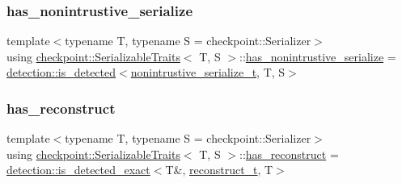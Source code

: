 \subsubsection{\texorpdfstring{has\+\_\+nonintrustive\+\_\+serialize}{has\_nonintrustive\_serialize}}
{\footnotesize\ttfamily template$<$typename T, typename S = checkpoint\+::\+Serializer$>$ \\
using \hyperlink{structcheckpoint_1_1_serializable_traits}{checkpoint\+::\+Serializable\+Traits}$<$ T, S $>$\+::\hyperlink{structcheckpoint_1_1_serializable_traits_abc3628bc485acd98b08840fb99450850}{has\+\_\+nonintrustive\+\_\+serialize} =  \hyperlink{namespacedetection_a30893549a3de1e9603d78dad6d5dce92}{detection\+::is\+\_\+detected}$<$\hyperlink{structcheckpoint_1_1_serializable_traits_a3284d2cfd29cfe429d5cf76186d3fe3c}{nonintrustive\+\_\+serialize\+\_\+t}, T, S$>$}

\mbox{\label{structcheckpoint_1_1_serializable_traits_a1c37f2f1a317fdd0d198c3d6ad2d35c4}} 
\subsubsection{\texorpdfstring{has\+\_\+reconstruct}{has\_reconstruct}}
{\footnotesize\ttfamily template$<$typename T, typename S = checkpoint\+::\+Serializer$>$ \\
using \hyperlink{structcheckpoint_1_1_serializable_traits}{checkpoint\+::\+Serializable\+Traits}$<$ T, S $>$\+::\hyperlink{structcheckpoint_1_1_serializable_traits_a1c37f2f1a317fdd0d198c3d6ad2d35c4}{has\+\_\+reconstruct} =  \hyperlink{namespacedetection_affc661f546e50448d9582e54280f7a11}{detection\+::is\+\_\+detected\+\_\+exact}$<$T\&, \hyperlink{structcheckpoint_1_1_serializable_traits_a9f161977ecf1aed8a4ccd5d63768399a}{reconstruct\+\_\+t}, T$>$}

\mbox{\label{structcheckpoint_1_1_serializable_traits_ab565b1e56509babb16ea5525ed4a3ebf}} 
